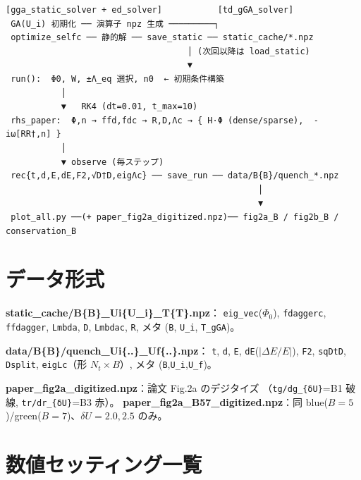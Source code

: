 \documentclass[11pt]{ltjsarticle}
\newcommand{\code}[1]{\texttt{#1}}
\begin{document}
\begin{center}
\begin{minipage}{0.92\textwidth}
\begin{lstlisting}
[gga_static_solver + ed_solver]           [td_gGA_solver]
 GA(U_i) 初期化 ── 演算子 npz 生成 ─────────┐
 optimize_selfc ── 静的解 ── save_static ── static_cache/*.npz
                                    │ (次回以降は load_static)
                                    ▼
 run():  Φ0, W, ±Λ_eq 選択, n0  ← 初期条件構築
           │
           ▼   RK4 (dt=0.01, t_max=10)
 rhs_paper:  Φ,n → ffd,fdc → R,D,Λc → { H·Φ (dense/sparse),  -iω[RR†,n] }
           │
           ▼ observe (毎ステップ)
 rec{t,d,E,dE,F2,√D†D,eigΛc} ── save_run ── data/B{B}/quench_*.npz
                                                  │
                                                  ▼
 plot_all.py ──(+ paper_fig2a_digitized.npz)── fig2a_B / fig2b_B / conservation_B
\end{lstlisting}
\end{minipage}
\end{center}

\section{データ形式}

\textbf{static\_cache/B\{B\}\_Ui\{U\_i\}\_T\{T\}.npz}：
\code{eig\_vec}($\Phi_0$), \code{fdaggerc}, \code{ffdagger}, \code{Lmbda}, \code{D},
\code{Lmbdac}, \code{R}, メタ (\code{B}, \code{U\_i}, \code{T\_gGA})。

\medskip
\textbf{data/B\{B\}/quench\_Ui\{..\}\_Uf\{..\}.npz}：
\code{t}, \code{d}, \code{E}, \code{dE}($|\Delta E/E|$), \code{F2},
\code{sqDtD}, \code{Dsplit}, \code{eigLc}（形 $N_t\times B$）, メタ (\code{B},\code{U\_i},\code{U\_f})。

\medskip
\textbf{paper\_fig2a\_digitized.npz}：論文 Fig.2a のデジタイズ
（\code{tg/dg\_\{δU\}}=B1 破線, \code{tr/dr\_\{δU\}}=B3 赤）。
\textbf{paper\_fig2a\_B57\_digitized.npz}：同 blue($B{=}5$)/green($B{=}7$)、$\delta U=2.0, 2.5$ のみ。

\section{数値セッティング一覧}
\end{document}
